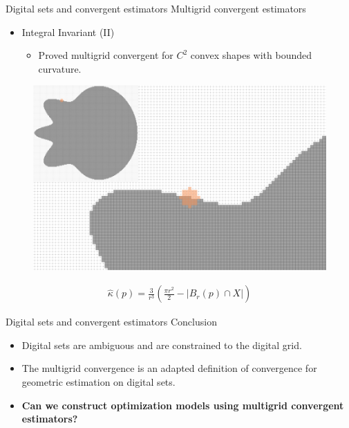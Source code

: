 
 \begin{frame}
	{Digital sets and convergent estimators}	
	{Multigrid convergent estimators}	
%
	\begin{itemize}
		\item{Integral Invariant (II)~}
		\begin{itemize}
			\item{Proved multigrid convergent for $C^2$ convex shapes with bounded curvature.}
		\end{itemize}		
	\end{itemize}
	
	
	\begin{figure}
	\includegraphics[scale=0.4]{figures/motivation/digital-geometric-estimators/ii/zoom/fr3-zoom.png}%
	\end{figure}		

	\begin{align*}
		\hat{\kappa}(p) = \frac{3}{r^3}\left( \frac{\pi r^2}{2} - | B_r(p) \cap X | \right )
	\end{align*}
	
      \end{frame}

\begin{frame}
	{Digital sets and convergent estimators}	
	{Conclusion}	

	\begin{itemize}
		\item{Digital sets are ambiguous and are constrained to the digital grid.}\\[1em]
		\item{The multigrid convergence is an adapted definition of convergence for geometric estimation on digital sets.}\\[2em]\pause
		\item[]{\textbf{Can we construct optimization models using multigrid convergent estimators?}}
	\end{itemize}

\end{frame}